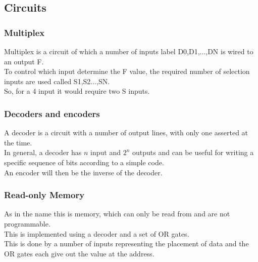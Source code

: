 \documentclass[12pt, a4paper]{article}
\begin{document}
			\subsection{Circuits}
				\subsubsection{Multiplex}
					Multiplex is a circuit of which a number of inputs label D0,D1,...,DN is wired to an output F.\\
					To control which input determine the F value, the required number of selection inputs are used called S1,S2...,SN.\\
					So, for a 4 input it would require two S inputs.\\
				\subsubsection{Decoders and encoders}
					A decoder is a circuit with a number of output lines, with only one asserted at the time.\\
					In general, a decoder has $n$ input and $2^n$ outputs and can be useful for writing a specific sequence of bits according to a simple code.\\
					An encoder will then be the inverse of the decoder.
				\subsubsection{Read-only Memory}
					As in the name this is memory, which can only be read from and are not programmable.\\
					This is implemented using a decoder and a set of OR gates.\\
					This is done by a number of inputs representing the placement of data and the OR gates each give out the value at the address.
\end{document}
